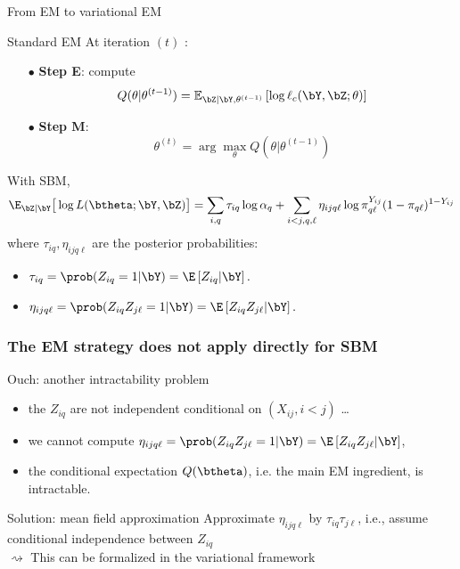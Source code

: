 \documentclass{beamer}\usepackage[]{graphicx}\usepackage[]{color}
\begin{document}
\begin{frame}{From EM to variational EM}

\begin{block}{Standard EM}
At iteration $(t)$ : 
\begin{itemize}
 \item[$\bullet$]\textbf{Step E}: compute 
 $$ Q(\theta | \theta^{(t-1)}) =   \mathbb E_{\bZ | \bY, \theta^{(t-1)} } \left[\log \ell_c(\bY,\bZ; \theta)  \right] $$
 \item[$\bullet$]\textbf{Step M}: 
 $$ \theta^{(t)} = \arg \max_{\theta} Q(\theta | \theta^{(t-1)})$$
 \end{itemize}
\end{block}

  With SBM,
    \begin{equation*}
      \E_{\bZ|\bY} \big[\log L(\btheta;\bY,\bZ) \big] = \sum_{i,q} \tau_{iq} \log \alpha_q + \sum_{i<j,q,\ell} \eta_{ijq\ell} \log \pi_{q\ell}^{Y_{ij}} (1-\pi_{q\ell})^{1-Y_{ij}}
    \end{equation*}
      where $\tau_ {iq}, \eta_{ijq\ell}$ are the posterior probabilities:
      \begin{itemize}
        \item $\tau_{iq} = \prob(Z_{iq} = 1 | \bY) = \E \left[Z_{iq} | \bY\right].$
        \item $\eta_{ijq\ell} = \prob(Z_{iq}Z_{j\ell} = 1 | \bY) = \E \left[Z_{iq}Z_{j\ell} | \bY\right].$
      \end{itemize}

\end{frame}

\begin{frame}
  \frametitle{The EM strategy does not apply directly for SBM}

  \begin{block}{Ouch: another intractability problem}
    \begin{itemize}
      \item the $Z_{iq}$ are \alert{not independent conditional on $(X_{ij}, i<j)$} \dots
      \item we cannot compute $\eta_{ijq\ell} = \prob(Z_{iq}Z_{j\ell} = 1 | \bY) = \E \left[Z_{iq}Z_{j\ell} | \bY\right]$,
      \item the conditional expectation $Q(\btheta)$, i.e. the main EM ingredient, is \alert{intractable}.
    \end{itemize}
  \end{block}

  \vfill

  \begin{block}{Solution: mean field approximation}
    Approximate $\eta_{ijq\ell}$ by $\tau_{iq}\tau_{j\ell}$, i.e., \alert{assume conditional independence between $Z_{iq}$}\\

    $\rightsquigarrow$ This can be formalized in the variational framework
  \end{block}


\end{frame}
\end{document}
